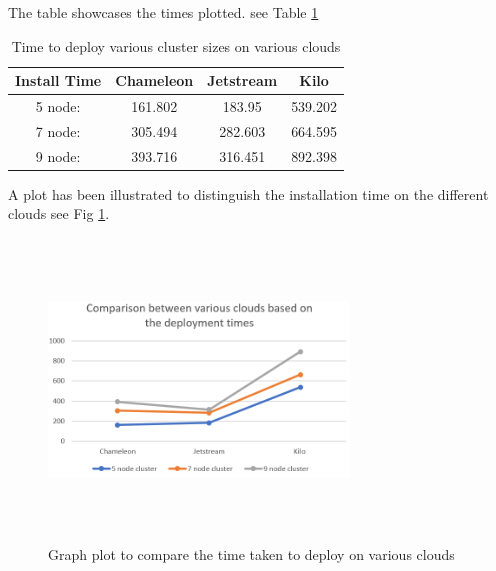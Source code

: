 \documentclass[9pt,twocolumn,twoside]{../../styles/osajnl}
\begin{document}
The table showcases the times plotted. see Table \ref{T:gvc}
\begin{table}[h]
\begin{center}
  \centering
  \caption{ Time to deploy various cluster sizes on various clouds}
  \label{T:gvc}
 \begin{tabular}{|c|| c c c|} 
 \hline
 Install Time & Chameleon  & Jetstream & Kilo \\ [0.5ex]
 \hline\hline
 5 node: & 161.802 & 183.95 & 539.202\\
 \hline
 7 node: & 305.494 & 282.603 & 664.595 \\
 \hline
 9 node: & 393.716 & 316.451 & 892.398 \\
 \hline
\end{tabular}
\end{center}
\end{table}

A plot has been illustrated to distinguish the installation time on
the different clouds see Fig \ref{gvc}.
\begin{figure}[!htb]
  \includegraphics[width=8cm,height=8cm,keepaspectratio,width=\linewidth]{images/bar-4.png}
  \caption{Graph plot to compare the time taken to deploy on various clouds}
  \label{gvc}
\end{figure}
\end{document}

